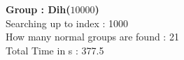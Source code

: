\textbf{Group : Dih($10000$)}\\
Searching up to index : 1000\\
How many normal groups are found : 21\\
Total Time in s : 377.5\\

